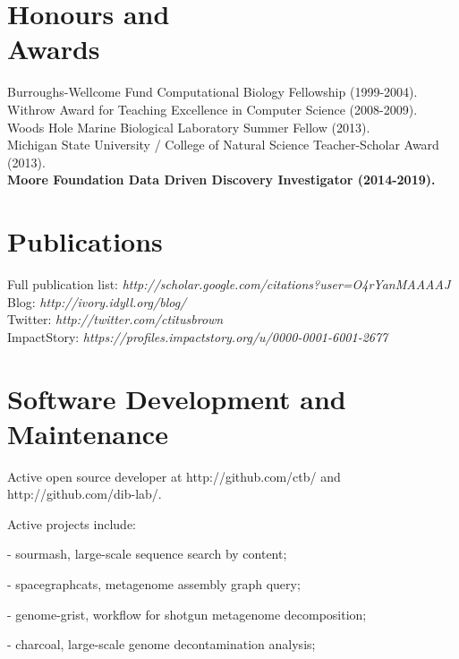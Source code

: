 \documentclass[margin,line]{resume}
\begin{document}
\begin{resume}
    \section{\mysidestyle Honours and\\Awards} 

Burroughs-Wellcome Fund Computational Biology Fellowship (1999-2004).\\
Withrow Award for Teaching Excellence in Computer Science (2008-2009). \\
Woods Hole Marine Biological Laboratory Summer Fellow (2013).\\
Michigan State University / College of Natural Science Teacher-Scholar Award (2013).\\
{\bf Moore Foundation Data Driven Discovery Investigator (2014-2019).}



    \section{\mysidestyle Publications}

    Full publication list: {\em http://scholar.google.com/citations?user=O4rYanMAAAAJ}\\
    Blog: {\em http://ivory.idyll.org/blog/}\\
    Twitter: {\em http://twitter.com/ctitusbrown}\\
    ImpactStory: {\em https://profiles.impactstory.org/u/0000-0001-6001-2677}

    \section{\mysidestyle Software Development and Maintenance}

    Active open source developer at http://github.com/ctb/ and http://github.com/dib-lab/.

    Active projects include:
    \begin{list1}
    \item[] - sourmash, large-scale sequence search by content;
    \item[] - spacegraphcats, metagenome assembly graph query;
    \item[] - genome-grist, workflow for shotgun metagenome decomposition;
    \item[] - charcoal, large-scale genome decontamination analysis;
    \end{list1}


\end{resume}
\end{document}
